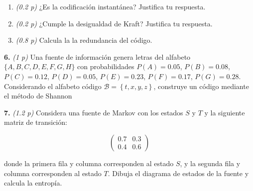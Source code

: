 \documentclass{article}
\begin{document}
\begin{enumerate}
    \item \textit{(0.2 p)} ¿Es la codificación instantánea? Justifica tu respuesta.
    \item \textit{(0.2 p)} ¿Cumple la desigualdad de Kraft? Justifica tu respuesta.
    \item \textit{(0.8 p)} Calcula la la redundancia del código.
\end{enumerate}

\textbf{6.} \textit{(1 p)} Una fuente de información genera letras del alfabeto \(\{A, B, C, D, E, F, G, H\}\) con probabilidades \(P(A) = 0.05\), \(P(B) = 0.08\), \(P(C) = 0.12\), \(P(D) = 0.05\), \(P(E) = 0.23\), \(P(F) = 0.17\), \(P(G) = 0.28\). Considerando el alfabeto código \(\mathcal{B} =\left\{t,x,y,z\right\}\), construye un código mediante el método de Shannon


\textbf{7.} \textit{(1.2 p)} Considera una fuente de Markov con los estados \(S\) y \(T\) y la siguiente matriz de transición:

\[
\begin{pmatrix}
0.7 & 0.3 \\
0.4 & 0.6
\end{pmatrix}
\]

donde la primera fila y columna corresponden al estado \(S\), y la segunda fila y columna corresponden al estado \(T\). Dibuja el diagrama de estados de la fuente y calcula la entropía.
\end{document}
